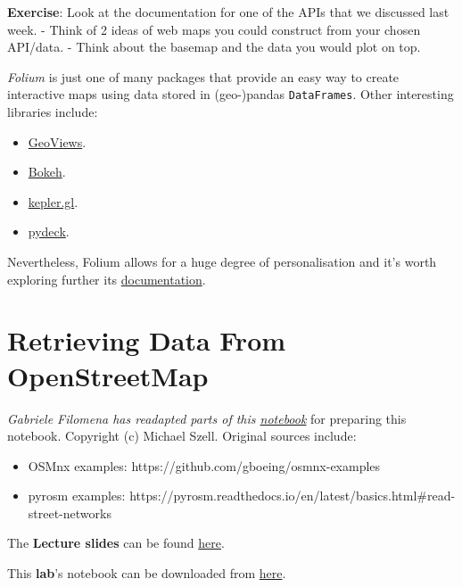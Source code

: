 \documentclass[
  letterpaper,
  DIV=11,
  numbers=noendperiod]{scrreprt}
\providecommand{\tightlist}{%
  \setlength{\itemsep}{0pt}\setlength{\parskip}{0pt}}\usepackage{longtable,booktabs,array}
\begin{document}
\textbf{Exercise}: Look at the documentation for one of the APIs that we
discussed last week. - Think of 2 ideas of web maps you could construct
from your chosen API/data. - Think about the basemap and the data you
would plot on top.

\emph{Folium} is just one of many packages that provide an easy way to
create interactive maps using data stored in (geo-)pandas
\texttt{DataFrames}. Other interesting libraries include:

\begin{itemize}
\tightlist
\item
  \href{https://geoviews.org/}{GeoViews}.
\item
  \href{https://docs.bokeh.org/en/latest/docs/gallery.html}{Bokeh}.
\item
  \href{https://docs.kepler.gl/docs/keplergl-jupyter}{kepler.gl}.
\item
  \href{https://deckgl.readthedocs.io/en/latest/}{pydeck}.
\end{itemize}

Nevertheless, Folium allows for a huge degree of personalisation and
it's worth exploring further its
\href{https://python-visualization.github.io/folium/latest/reference.html}{documentation}.


\chapter{Retrieving Data From
OpenStreetMap}\label{retrieving-data-from-openstreetmap}

\emph{Gabriele Filomena has readapted parts of this
\href{https://github.com/mszell/geospatialdatascience/blob/main/unit08_openstreetmap/lecture08.ipynb}{notebook}}
for preparing this notebook. Copyright (c) Michael Szell. Original
sources include:

\begin{itemize}
\tightlist
\item
  OSMnx examples: https://github.com/gboeing/osmnx-examples
\item
  pyrosm examples:
  https://pyrosm.readthedocs.io/en/latest/basics.html\#read-street-networks
\end{itemize}

The \textbf{Lecture slides} can be found
\href{https://github.com/GDSL-UL/wma/raw/main/lectures/w07.pdf}{here}.

This \textbf{lab}'s notebook can be downloaded from
\href{https://github.com/GDSL-UL/wma/blob/main/labs/w07_osm.ipynb}{here}.
\end{document}
